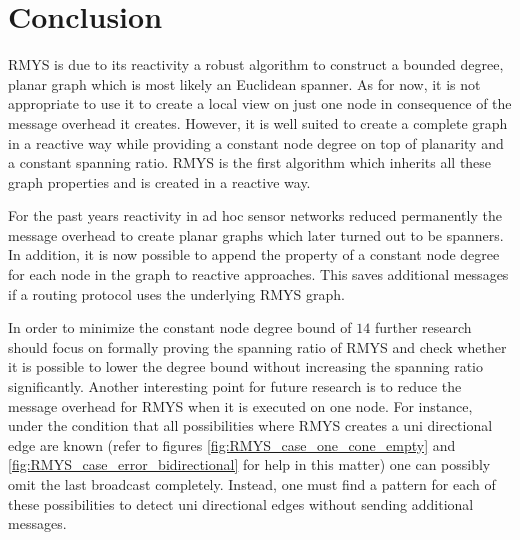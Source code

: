 \section{Conclusion}
RMYS is due to its reactivity a robust algorithm to construct a bounded degree, planar graph which is most likely an Euclidean spanner.
As for now, it is not appropriate to use it to create a local view on just one node in consequence of the message overhead it creates.
However, it is well suited to create a complete graph in a reactive way while providing a constant node degree on top of planarity and a constant spanning ratio.
RMYS is the first algorithm which inherits all these graph properties and is created in a reactive way.

For the past years reactivity in ad hoc sensor networks reduced permanently the message overhead to create planar graphs which later turned out to be spanners.
In addition, it is now possible to append the property of a constant node degree for each node in the graph to reactive approaches.
This saves additional messages if a routing protocol uses the underlying RMYS graph.

In order to minimize the constant node degree bound of $14 $ further research should focus on formally proving the spanning ratio of RMYS and check whether it is possible to lower the degree bound without increasing the spanning ratio significantly.
Another interesting point for future research is to reduce the message overhead for RMYS when it is executed on one node.
For instance, under the condition that all possibilities where RMYS creates a uni directional edge are known (refer to figures \ref{fig:RMYS_case_one_cone_empty} and \ref{fig:RMYS_case_error_bidirectional} for help in this matter) one can possibly omit the last broadcast completely.
Instead, one must find a pattern for each of these possibilities to detect uni directional edges without sending additional messages.
